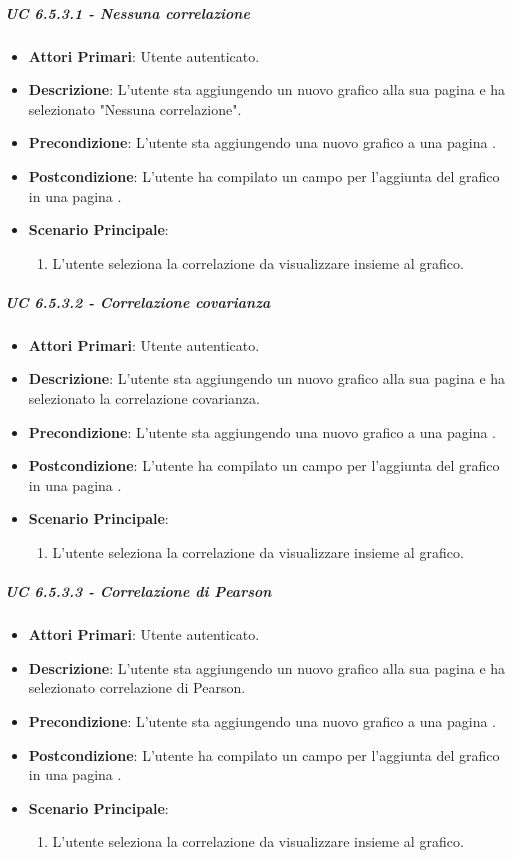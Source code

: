 			\subparagraph{UC 6.5.3.1 - Nessuna correlazione}
			\begin{itemize}
				\item \textbf{Attori Primari}: Utente autenticato.
				\item \textbf{Descrizione}: L'utente sta aggiungendo un nuovo grafico alla sua pagina  e ha selezionato "Nessuna correlazione". 
				\item \textbf{Precondizione}: L'utente sta aggiungendo una nuovo grafico a una pagina .
				\item \textbf{Postcondizione}: L'utente ha compilato un campo per l'aggiunta del grafico in una pagina .
				\item \textbf{Scenario Principale}:
				\begin{enumerate}
					\item{L'utente seleziona la correlazione da visualizzare insieme al grafico.}
				\end{enumerate}	
			\end{itemize}

			\subparagraph{UC 6.5.3.2 - Correlazione covarianza}
			\begin{itemize}
				\item \textbf{Attori Primari}: Utente autenticato.
				\item \textbf{Descrizione}: L'utente sta aggiungendo un nuovo grafico alla sua pagina  e ha selezionato la correlazione covarianza. 
				\item \textbf{Precondizione}: L'utente sta aggiungendo una nuovo grafico a una pagina .
				\item \textbf{Postcondizione}: L'utente ha compilato un campo per l'aggiunta del grafico in una pagina .
				\item \textbf{Scenario Principale}:
				\begin{enumerate}
					\item{L'utente seleziona la correlazione da visualizzare insieme al grafico.}
				\end{enumerate}	
			\end{itemize}

			\subparagraph{UC 6.5.3.3 - Correlazione di Pearson}
			\begin{itemize}
				\item \textbf{Attori Primari}: Utente autenticato.
				\item \textbf{Descrizione}: L'utente sta aggiungendo un nuovo grafico alla sua pagina  e ha selezionato correlazione di Pearson. 
				\item \textbf{Precondizione}: L'utente sta aggiungendo una nuovo grafico a una pagina .
				\item \textbf{Postcondizione}: L'utente ha compilato un campo per l'aggiunta del grafico in una pagina .
				\item \textbf{Scenario Principale}:
				\begin{enumerate}
					\item{L'utente seleziona la correlazione da visualizzare insieme al grafico.}
				\end{enumerate}	
			\end{itemize}

